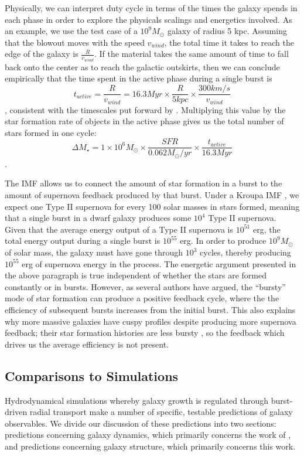 \documentclass[iop]{emulateapj}
\begin{document}
Physically, we can interpret duty cycle in terms of the times the galaxy spends in each phase in order to explore the physicals scalings and energetics involved. As an example, we use the test case of a $10^9 M_{\odot}$ galaxy of radius 5 kpc. Assuming that the blowout moves with the speed $v_{wind}$, the total time it takes to reach the edge of the galaxy is $\frac{R}{v_{wind}}$. If the material takes the same amount of time to fall back onto the center as to reach the galactic outskirts, then we can conclude empirically that the time spent in the active phase during a single burst is $$t_{active} = \frac{R}{v_{wind}} = 16.3 Myr \times \frac{R}{5 kpc}\times \frac{300 km/s}{v_{wind}}  $$, consistent with the timescales put forward by \cite{EB17}. Multiplying this value by the star formation rate of objects in the active phase gives us the total number of stars formed in one cycle:
$$\Delta M_{\star} = 1 \times 10^6 M_{\odot} \times \frac{SFR}{0.062 M_{\odot}/yr} \times \frac{t_{active}}{16.3 Myr}$$.

The IMF allows us to connect the amount of star formation in a burst to the amount of supernova feedback produced by that burst. Under a Kroupa IMF \citep{Kroupa02}, we expect one Type II supernova for every 100 solar masses in stars formed, meaning that a single burst in a dwarf galaxy produces some $10^4$ Type II supernova. Given that the average energy output of a Type II supernova is $10^{51}$ erg, the total energy output during a single burst is $10^{55}$ erg. In order to produce $10^9 M_{\odot}$ of solar mass, the galaxy must have gone through $10^3$ cycles, thereby producing $10^{55}$ erg of supernova energy in the process. The energetic argument presented in the above paragraph is true independent of whether the stars are formed constantly or in bursts. However, as several authors \citep{Governato12,GK13} have argued, the ``bursty'' mode of star formation can produce a positive feedback cycle, where the the efficiency of subsequent bursts increases from the initial burst. This also explains why more massive galaxies have cuspy profiles despite producing more supernova feedback; their star formation histories are less bursty \citep{Guo16}, so the feedback which drives us the average efficiency is not present.

\subsection{Comparisons to Simulations}

Hydrodynamical simulations whereby galaxy growth is regulated through burst-driven radial transport make a number of specific, testable predictions of galaxy observables. We divide our discussion of these predictions into two sections: predictions concerning galaxy dynamics, which primarily concerns the work of \cite{Cicone16}, and predictions concerning galaxy structure, which primarily concerns this work.
\end{document}
